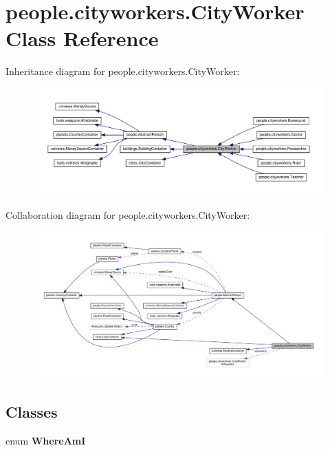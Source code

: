 \hypertarget{classpeople_1_1cityworkers_1_1_city_worker}{}\section{people.\+cityworkers.\+City\+Worker Class Reference}
\label{classpeople_1_1cityworkers_1_1_city_worker}


Inheritance diagram for people.\+cityworkers.\+City\+Worker\+:
\nopagebreak
\begin{figure}[H]
\begin{center}
\leavevmode
\includegraphics[width=350pt]{classpeople_1_1cityworkers_1_1_city_worker__inherit__graph}
\end{center}
\end{figure}


Collaboration diagram for people.\+cityworkers.\+City\+Worker\+:
\nopagebreak
\begin{figure}[H]
\begin{center}
\leavevmode
\includegraphics[width=350pt]{classpeople_1_1cityworkers_1_1_city_worker__coll__graph}
\end{center}
\end{figure}
\subsection*{Classes}
\begin{DoxyCompactItemize}
\item 
enum {\bfseries Where\+AmI}
\end{DoxyCompactItemize}

